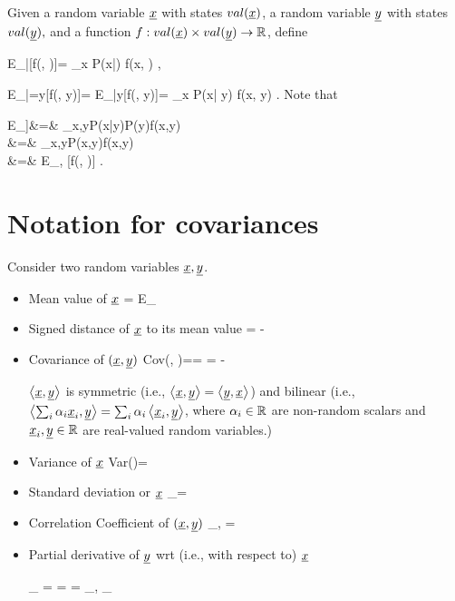 Given a random variable $\rvx$ with states $val(\rvx)$, a random variable $\rvy$ with states $val(\rvy),$ and a function $f:val(\rvx)\times val(\rvy)\rarrow \RR$, define

\beq
E_{\rvx|\rvy}[f(\rvx, \rvy)]=
\sum_x P(x|\rvy) f(x, \rvy)
\;,
\eeq

\beq
E_{\rvx|\rvy=y}[f(\rvx, y)]=
E_{\rvx|y}[f(\rvx, y)]= \sum_x P(x| y) f(x, y)
\;.
\eeq
Note that

\beqa
E_\rvy[E_{\rvx|\rvy}[f(\rvx, \rvy)]]&=&
\sum_{x,y}P(x|y)P(y)f(x,y)
\\&=&
\sum_{x,y}P(x,y)f(x,y)
\\&=&
E_{\rvx, \rvy}[f(\rvx, \rvy)]
\;.
\eeqa



\section{Notation
for covariances}
\label{sec-notation-cov}

Consider two random variables $\rvx, \rvy$.

\begin{itemize}
\item
Mean value of $\rvx$
\beq
\av{\rvx}=
E_\rvx[\rvx]
\eeq

\item
Signed distance of $\rvx$ to its mean value
\beq
\Delta \rvx = \rvx - \av{\rvx}
\eeq

\item
Covariance of $(\rvx, \rvy)$
\beq
Cov(\rvx, \rvy)=\av{\rvx, \rvy}=
\av{\Delta \rvx \Delta \rvy}
=
\av{\rvx\rvy}-\av{\rvx}\av{\rvy}
\eeq

$\av{\rvx, \rvy}$ is symmetric
(i.e., $\av{\rvx, \rvy}=\av{\rvy, \rvx}$)
and bilinear (i.e.,
$\av{\sum_i \alp_i\rvx_i, \rvy}
=
\sum_i\alp_i\av{\rvx_i, \rvy}$, where
$\alpha_i\in { \mathbb{R}}$
are non-random scalars
and $\rvx_i, \rvy\in\RR$ are
real-valued random
variables.)

\item
Variance of $\rvx$
\beq
Var(\rvx)=\av{\rvx, \rvx}
\eeq

\item
Standard deviation or $\rvx$
\beq
\sigma_\rvx=\sqrt{\av{\rvx, \rvx}}
\eeq

\item
Correlation Coefficient of $(\rvx, \rvy)$
\beq
\rho_{\rvx, \rvy}=
\frac{\av{\rvx, \rvy}}
{\sqrt{\av{\rvx, \rvx}\av{\rvy, \rvy}}}
\eeq

\item Partial derivative of $\rvy$
wrt (i.e., with respect to) $\rvx$

\beq
\partial_\rvx\rvy
=
\pder{\rvy}{\rvx}
=
\frac{\av{\rvx,\rvy}}
{\av{\rvx, \rvx}}
=
\rho_{\rvx, \rvy}\frac{
\s_\rvy}
{\s_\rvx}
\eeq
\end{itemize}


